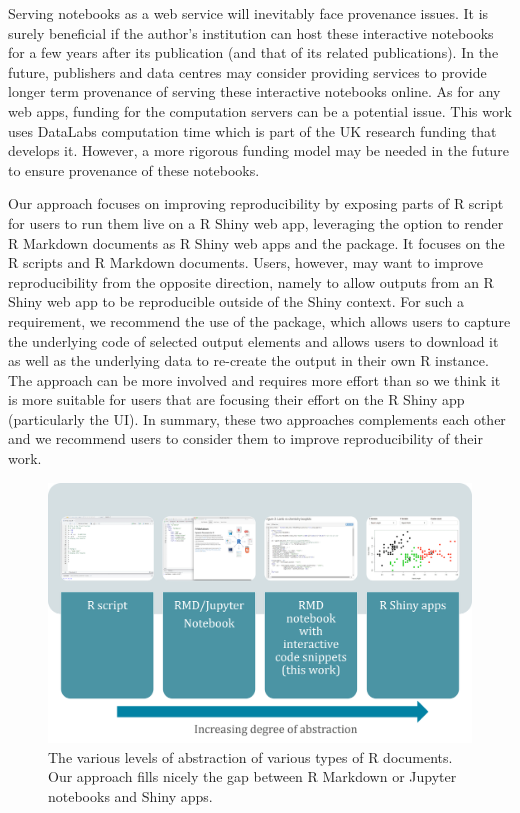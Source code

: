 Serving notebooks as a web service will inevitably face provenance
issues. It is surely beneficial if the author's institution can host
these interactive notebooks for a few years after its publication (and
that of its related publications). In the future, publishers and data
centres may consider providing services to provide longer term
provenance of serving these interactive notebooks online. As for any web
apps, funding for the computation servers can be a potential issue. This
work uses DataLabs computation time which is part of the UK research
funding that develops it. However, a more rigorous funding model may be
needed in the future to ensure provenance of these notebooks.

Our approach focuses on improving reproducibility by exposing parts of R
script for users to run them live on a R Shiny web app, leveraging the
option to render R Markdown documents as R Shiny web apps and the
 package. It focuses on the R scripts and R Markdown
documents. Users, however, may want to improve reproducibility from the
opposite direction, namely to allow outputs from an R Shiny web app to
be reproducible outside of the Shiny context. For such a requirement, we
recommend the use of the  \citep{shinymeta} package,
which allows users to capture the underlying code of selected output
elements and allows users to download it as well as the underlying data
to re-create the output in their own R instance. The 
approach can be more involved and requires more effort than
 so we think it is more suitable for users that are
focusing their effort on the R Shiny app (particularly the UI). In
summary, these two approaches complements each other and we recommend
users to consider them to improve reproducibility of their work.

\begin{Schunk}
\begin{figure}
\includegraphics[width=\textwidth]{learnr_abstraction} \caption[The various levels of abstraction of various types of R documents]{The various levels of abstraction of various types of R documents. Our approach fills nicely the gap between R Markdown or Jupyter notebooks and Shiny apps.}\label{fig:fig1}
\end{figure}
\end{Schunk}

